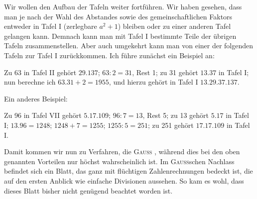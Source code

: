 Wir wollen den Aufbau der Tafeln weiter fortführen. Wir haben
gesehen, dass man je nach der Wahl des Abstandes sowie des gemeinschaftlichen Faktors entweder in Tafel I (zerlegbare $a^2+1$) bleiben oder zu einer
anderen Tafel gelangen kann. Demnach kann man mit Tafel I bestimmte
Teile der übrigen Tafeln zusammenstellen. Aber auch umgekehrt kann man
von einer der folgenden Tafeln zur Tafel I zurückkommen. Ich führe zunächst ein Beispiel an:

Zu 63 in Tafel II gehört $29\mathord{.}137$; $63:2=31$, Rest 1; zu 31 gehört
$13\mathord{.}37$ in Tafel I; nun berechne ich $63\mathord{.}31+2=1955$, und hierzu gehört in
Tafel I $13\mathord{.}29\mathord{.}37\mathord{.}137$.

Ein anderes Beispiel:

Zu 96 in Tafel VII gehört $5\mathord{.}17\mathord{.}109$; $96:7=13$, Rest 5; zu 13 gehört $5\mathord{.}17$ in Tafel I; $13\mathord{.}96=1248$; $1248+7=1255$; $1255:5=251$; zu
251 gehört $17\mathord{.}17\mathord{.}109$ in Tafel I.

Damit kommen wir nun zu Verfahren, die \textsc{Gauss} , während dies bei den oben genannten Vorteilen nur höchst wahrscheinlich ist. Im \textsc{Gauss}schen Nachlass befindet sich ein Blatt, das ganz mit flüchtigen Zahlenrechnungen bedeckt ist, die auf den ersten Anblick wie einfache
Divisionen aussehen. So kam es wohl, dass dieses Blatt bisher nicht genügend
beachtet worden ist.
\clearpage\endgroup
